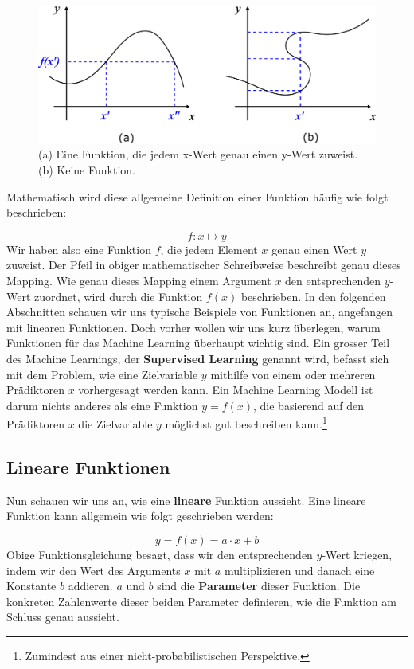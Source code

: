 \documentclass[
]{book}
\begin{document}
\begin{figure}

{\centering \includegraphics[width=0.8\linewidth]{images/Functions} 

}

\caption{(a) Eine Funktion, die jedem x-Wert genau einen y-Wert zuweist. (b) Keine Funktion. }\label{fig:functions}
\end{figure}

Mathematisch wird diese allgemeine Definition einer Funktion häufig wie folgt beschrieben:

\[
f : x \mapsto y
\]
Wir haben also eine Funktion \(f\), die jedem Element \(x\) genau einen Wert \(y\) zuweist. Der Pfeil in obiger mathematischer Schreibweise beschreibt genau dieses Mapping. Wie genau dieses Mapping einem Argument \(x\) den entsprechenden \(y\)-Wert zuordnet, wird durch die Funktion \(f(x)\) beschrieben. In den folgenden Abschnitten schauen wir uns typische Beispiele von Funktionen an, angefangen mit linearen Funktionen. Doch vorher wollen wir uns kurz überlegen, warum Funktionen für das Machine Learning überhaupt wichtig sind. Ein grosser Teil des Machine Learnings, der \textbf{Supervised Learning} genannt wird, befasst sich mit dem Problem, wie eine Zielvariable \(y\) mithilfe von einem oder mehreren Prädiktoren \(x\) vorhergesagt werden kann. Ein Machine Learning Modell ist darum nichts anderes als eine Funktion \(y=f(x)\), die basierend auf den Prädiktoren \(x\) die Zielvariable \(y\) möglichst gut beschreiben kann.\footnote{Zumindest aus einer nicht-probabilistischen Perspektive.}

\hypertarget{lineare-funktionen}{%
\subsection{Lineare Funktionen}\label{lineare-funktionen}}

Nun schauen wir uns an, wie eine \textbf{lineare} Funktion aussieht. Eine lineare Funktion kann allgemein wie folgt geschrieben werden:

\[
y = f(x) = a \cdot x + b
\]
Obige Funktionsgleichung besagt, dass wir den entsprechenden \(y\)-Wert kriegen, indem wir den Wert des Arguments \(x\) mit \(a\) multiplizieren und danach eine Konstante \(b\) addieren. \(a\) und \(b\) sind die \textbf{Parameter} dieser Funktion. Die konkreten Zahlenwerte dieser beiden Parameter definieren, wie die Funktion am Schluss genau aussieht.
\end{document}
